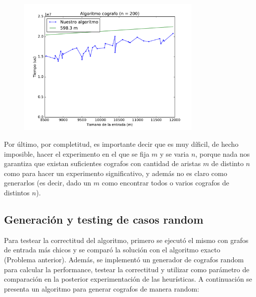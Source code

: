 \begin{figure}[H]
 \centering
	\includegraphics[width=0.8\textwidth]{graficos/problema_3/tiempos1.pdf}
	\caption{}
	\label{fig:problema3-tiempos1}
\end{figure}

Por último, por completitud, es importante decir que es muy díficil, de hecho imposible, hacer el experimento en el que se fija $m$ y se varia $n$, porque nada nos garantiza  que existan suficientes cografos con cantidad de aristas $m$ de distinto $n$ como para hacer un experimento significativo, y además no es claro como generarlos (es decir, dado un $m$ como encontrar todos o varios cografos de distintos $n$).


\subsection{Generación y testing de casos random}

Para testear la correctitud del algoritmo, primero se ejecutó el mismo con grafos de entrada más chicos y se comparó la solución con el algoritmo exacto (Problema anterior). Además, se implementó un generador de cografos random para calcular la performance, testear la correctitud y utilizar como parámetro de comparación en la posterior experimentación de las heurísticas.
A continuación se presenta un algoritmo para generar cografos de manera random:

